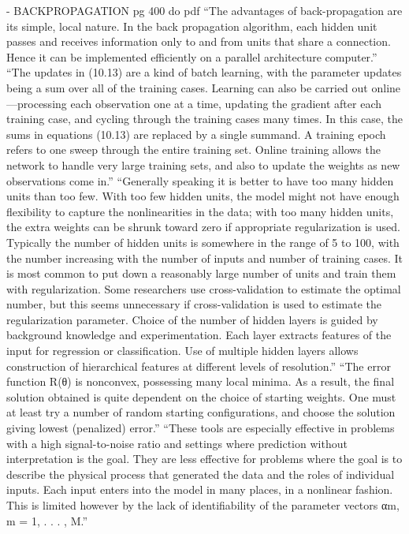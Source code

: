 \documentclass{automatextcc}
\begin{document}
- BACKPROPAGATION pg 400 do pdf
``The advantages of back-propagation are its simple, local nature. In the back propagation algorithm, each hidden unit passes and receives information only to and from units that share a connection. Hence it can be implemented efficiently on a parallel architecture computer.''
``The updates in (10.13) are a kind of batch learning, with the parameter updates being a sum over all of the training cases. Learning can also be carried out online—processing each observation one at a time, updating the gradient after each training case, and cycling through the training cases many times. In this case, the sums in equations (10.13) are replaced by a single summand. A training epoch refers to one sweep through the entire training set. Online training allows the network to handle very large training sets, and also to update the weights as new observations come in.''
``Generally speaking it is better to have too many hidden units than too few. With too few hidden units, the model might not have enough flexibility to capture the nonlinearities in the data; with too many hidden units, the extra weights can be shrunk toward zero if appropriate regularization is used. Typically the number of hidden units is somewhere in the range of 5 to 100, with the number increasing with the number of inputs and number of training cases. It is most common to put down a reasonably large number of units and train them with regularization. Some researchers use cross-validation to estimate the optimal number, but this seems unnecessary if cross-validation is used to estimate the regularization parameter. Choice of the number of hidden layers is guided by background knowledge and experimentation. Each layer extracts features of the input for regression or classification. Use of multiple hidden layers allows construction of hierarchical features at different levels of resolution.''
``The error function R(θ) is nonconvex, possessing many local minima. As a result, the final solution obtained is quite dependent on the choice of starting weights. One must at least try a number of random starting configurations, and choose the solution giving lowest (penalized) error.''
``These tools are especially effective in problems with a high signal-to-noise ratio and settings where prediction without interpretation is the goal. They are less effective for problems where the goal is to describe the physical process that generated the data and the roles of individual inputs. Each input enters into the model in many places, in a nonlinear fashion. This is limited however by the lack of identifiability of the parameter vectors αm, m = 1, . . . , M.''
\end{document}
